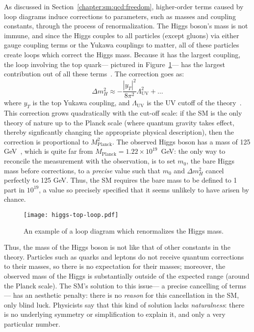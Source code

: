 As discussed in Section~\ref{chapter:sm:qcd:freedom}, higher-order terms caused by loop diagrams induce corrections to parameters, such as masses and coupling constants, through the process of renormalization. The Higgs boson's mass is not immune, and since the Higgs couples to all particles (except gluons) via either gauge coupling terms or the Yukawa couplings to matter, all of these particles create loops which correct the Higgs mass. Because it has the largest coupling, the loop involving the top quark--- pictured in Figure~\ref{fig:susy:higgs-loop}---  has the largest contribution out of all these terms~\cite{Martin1997}. The correction goes as:
%
\begin{equation}
\Delta m_H^2 \approx - \frac{|y_T|^2}{8\pi^2}\Lambda_\mathrm{UV}^2 + \ldots
\end{equation}
%
where $y_T$ is the top Yukawa coupling, and $\Lambda_\mathrm{UV}$ is the UV cutoff of the theory~\cite{Martin1997}. This correction grows quadratically with the cut-off scale: if the SM is the only theory of nature up to the Planck scale (where quantum gravity takes effect, thereby signficantly changing the appropriate physical description), then the correction is proportional to $M_\mathrm{Planck}^2$. The observed Higgs boson has a mass of 125 GeV~\cite{CombinedHiggs}, which is quite far from $M_\mathrm{Planck} = 1.22\times 10^{19}$~GeV: the only way to reconcile the measurement with the observation, is to set $m_0$, the bare Higgs mass before corrections, to a \textit{precise} value such that $m_0$ and $\Delta m_H^2$ cancel perfectly to 125 GeV. Thus, the SM requires the bare mass to be  defined to 1 part in $10^{19}$, a value so precisely specified that it seems unlikely to have arisen by chance. 


\begin{figure}
\centering
\texttt{[image: higgs-top-loop.pdf]}
\caption{An example of a loop diagram which renormalizes the Higgs mass.}
\label{fig:susy:higgs-loop}
\end{figure}


Thus, the mass of the Higgs boson is not like that of other constants in the theory. Particles such as quarks and leptons do not receive quantum corrections to their masses, so there is no expectation for their masses; moreover, the observed mass of the Higgs is substantially outside of the expected range (around the Planck scale).  The SM's solution to this issue--- a precise cancelling of terms--- has an aesthetic penalty: there is no \textit{reason} for this cancellation in the SM, only blind luck. Physicists say that this kind of solution lacks \textit{naturalness}: there is no underlying symmetry or simplification to explain it, and only a very particular number.



